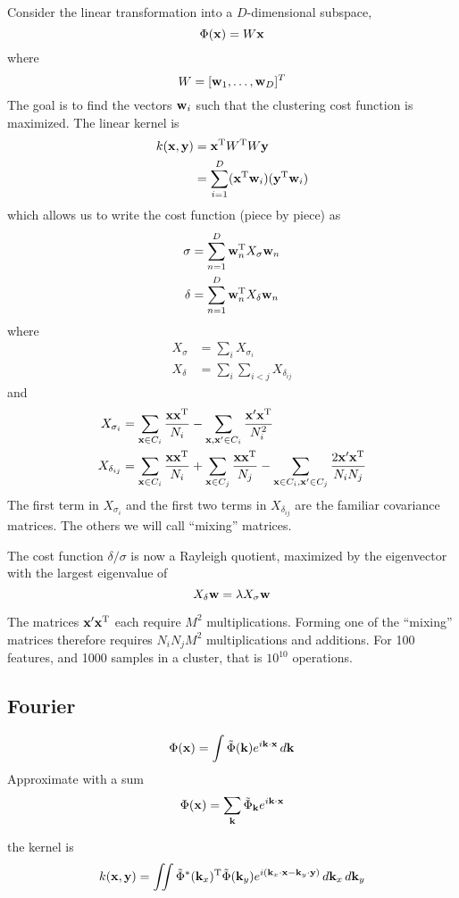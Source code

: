 \documentclass{article}
\newcommand{\bx}{{\bf x}}
\newcommand{\by}{{\bf y}}
\newcommand{\bw}{{\bf w}}
\newcommand{\bk}{{\bf k}}
\newcommand{\bxp}{\bx^{\prime}}
\begin{document}
Consider the linear transformation into a
$D$-dimensional subspace,
\[
\Phi(\bx) = W \bx
\]
where
\[
W = [\bw_1, \ldots, \bw_D]^T
\]
The goal is to find the vectors $\bw_i$ such that the clustering
cost function is maximized. The linear kernel is
\begin{align*}
k(\bx, \by)
  &= \bx^{\rm T} W^{\rm T} W \by \\
  &= \sum_{i=1}^D (\bx^{\rm T} \bw_i) (\by^{\rm T} \bw_i)
\end{align*}
which allows us to write the cost function (piece by piece) as
\begin{align*}
\sigma &= \sum_{n=1}^D \bw_n^{\rm T} X_{\sigma} \bw_n \\
\delta &= \sum_{n=1}^D \bw_n^{\rm T} X_{\delta} \bw_n
\end{align*}
where
\begin{align*}
X_{\sigma} &= \sum_i X_{\sigma_i} \\
X_{\delta} &= \sum_i \sum_{i<j} X_{\delta_{ij}}
\end{align*}
and
\begin{align*}
X_{\sigma_i} &=
  \sum_{\bx \in C_i} \frac{\bx \bx^{\rm T}}{N_i} -
  \sum_{\bx, \bxp \in C_i} \frac{\bxp \bx^{\rm T}}{N_i^2} \\
X_{\delta_{ij}} &=
  \sum_{\bx \in C_i} \frac{\bx \bx^{\rm T}}{N_i} +
  \sum_{\bx \in C_j} \frac{\bx \bx^{\rm T}}{N_j} -
  \sum_{\bx \in C_i, \bxp \in C_j} \frac{2 \bxp \bx^{\rm T}}{N_i N_j}
\end{align*}
The first term in $X_{\sigma_i}$ and the first two terms in
$X_{\delta_{ij}}$ are the familiar covariance matrices. The
others we will call ``mixing'' matrices.

The cost function $\delta / \sigma$ is now a Rayleigh quotient,
maximized by the eigenvector with the largest eigenvalue of
\[
X_{\delta} \bw = \lambda X_{\sigma} \bw
\]

The matrices $\bxp \bx^{\rm T}$ each require $M^2$ multiplications.
Forming one of the ``mixing'' matrices therefore requires $N_i N_j
M^2$ multiplications and additions. For 100 features, and 1000 samples
in a cluster, that is $10^{10}$ operations.


\subsection*{Fourier}

\[
\Phi(\bx) = \int \tilde{\Phi}(\bk) e^{i \bk \cdot \bx} \, d \bk
\]
Approximate with a sum
\[
\Phi(\bx) = \sum_{\bk} \tilde{\Phi}_{\bk} e^{i \bk \cdot \bx}
\]

the kernel is
\[
k(\bx, \by) = \iint \tilde{\Phi}^*(\bk_x)^{\rm T}
\tilde{\Phi}(\bk_y) e^{i (\bk_x \cdot \bx - \bk_y \cdot \by)}
\, d \bk_x \, d \bk_y
\]
\end{document}
